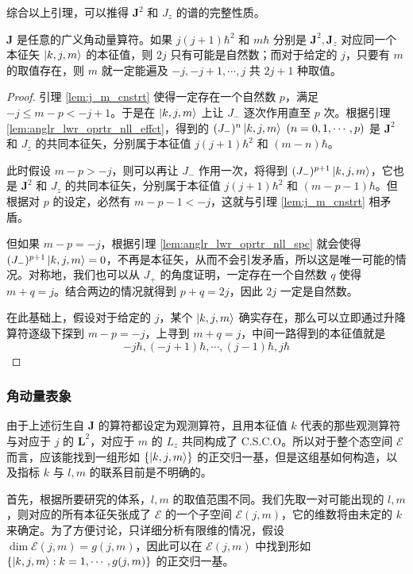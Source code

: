 \documentclass[cn,10pt,math=newtx,citestyle=gb7714-2015,bibstyle=gb7714-2015]{elegantbook}
\def\bm{\boldsymbol}
\def\ms{\mathscr}
\begin{document}
综合以上引理，可以推得 $\bm J^2$ 和 $J_z$ 的谱的完整性质。
\begin{theorem}[角动量算符的谱]\label{thm:anglr_mmntm_spctrm}
   $\bm J$ 是任意的广义角动量算符。如果 $j(j+1)\hbar^2$ 和 $m\hbar$ 分别是 $\bm J^2,\bm J_z$ 对应同一个本征矢 $\ket{k,j,m}$ 的本征值，则 $2j$ 只有可能是自然数；而对于给定的 $j$，只要有 $m$ 的取值存在，则 $m$ 就一定能遍及 $-j,-j+1,\cdots,j$ 共 $2j+1$ 种取值。
\end{theorem}
\begin{proof}
    引理 \ref{lem:j_m_cnstrt} 使得一定存在一个自然数 $p$，满足 $-j\le m-p< -j+1$。于是在 $\ket{k,j,m}$ 上让 $J_-$ 逐次作用直至 $p$ 次。根据引理 \ref{lem:anglr_lwr_oprtr_nll_effct}，得到的 $(J_-)^n\ket{k,j,m}\ (n=0,1,\cdots,p)$ 是 $\bm J^2$ 和 $J_z$ 的共同本征矢，分别属于本征值 $j(j+1)\hbar^2$ 和 $(m-n)\hbar$。
    
    此时假设 $m-p>-j$，则可以再让 $J_-$ 作用一次，将得到 $(J_-)^{p+1}\ket{k,j,m}$，它也是 $\bm J^2$ 和 $J_z$ 的共同本征矢，分别属于本征值 $j(j+1)\hbar^2$ 和 $(m-p-1)\hbar$。但根据对 $p$ 的设定，必然有 $m-p-1<-j$，这就与引理  \ref{lem:j_m_cnstrt} 相矛盾。
    
    但如果 $m-p=-j$，根据引理 \ref{lem:anglr_lwr_oprtr_nll_spc} 就会使得 $(J_-)^{p+1}\ket{k,j,m}=0$，不再是本征矢，从而不会引发矛盾，所以这是唯一可能的情况。对称地，我们也可以从 $J_+$ 的角度证明，一定存在一个自然数 $q$ 使得 $m+q=j$。结合两边的情况就得到 $p+q=2j$，因此 $2j$ 一定是自然数。
    
    在此基础上，假设对于给定的 $j$，某个 $\ket{k,j,m}$ 确实存在，那么可以立即通过升降算符逐级下探到 $m-p=-j$，上寻到 $m+q=j$，中间一路得到的本征值就是
    \begin{equation}
        -j\hbar,(-j+1)\hbar,\cdots,(j-1)\hbar,j\hbar
    \end{equation}
\end{proof}

\subsubsection{角动量表象}
    由于上述衍生自 $\bm J$ 的算符都设定为观测算符，且用本征值 $k$ 代表的那些观测算符与对应于 $j$ 的 $\bm L^2$，对应于 $m$ 的 $L_z$ 共同构成了 C.S.C.O。所以对于整个态空间 $\ms E$ 而言，应该能找到一组形如 $\{\ket{k,j,m}\}$ 的正交归一基，但是这组基如何构造，以及指标 $k$ 与 $l,m$ 的联系目前是不明确的。
    
    首先，根据所要研究的体系，$l,m$ 的取值范围不同。我们先取一对可能出现的 $l,m$，则对应的所有本征矢张成了 $\ms E$ 的一个子空间 $\ms E(j,m)$，它的维数将由未定的 $k$ 来确定。为了方便讨论，只详细分析有限维的情况，假设 $\dim \ms E(j,m)=g(j,m)$，因此可以在 $\ms E(j,m)$ 中找到形如 $\{\ket{k,j,m}:k=1,\cdots,g(j,m)\}$ 的正交归一基。
    
\end{document}
